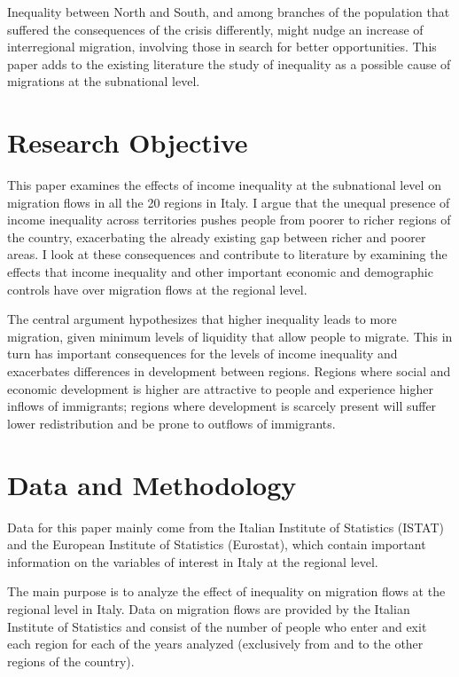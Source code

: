 \documentclass{article}
\theoremstyle{definition}
\theoremstyle{remark}
\begin{document}
Inequality between North and South, and among branches of the population that suffered the consequences of the crisis differently, might nudge an increase of interregional migration, involving those in search for better opportunities. This paper adds to the existing literature the study of inequality as a possible cause of migrations at the subnational level. 

\section{Research Objective}
This paper examines the effects of income inequality at the subnational level on migration flows in all the 20 regions in Italy. I argue that the unequal presence of income inequality across territories pushes people from poorer to richer regions of the country, exacerbating the already existing gap between richer and poorer areas. I look at these consequences and contribute to literature by examining the effects that income inequality and other important economic and demographic controls have over migration flows at the regional level.

The central argument hypothesizes that higher inequality leads to more migration, given minimum levels of liquidity that allow people to migrate. This in turn has important consequences for the levels of income inequality and exacerbates differences in development between regions. Regions where social and economic development is higher are attractive to people and experience higher inflows of immigrants; regions where development is scarcely present will suffer lower redistribution and be prone to outflows of immigrants. 

\section{Data and Methodology}
Data for this paper mainly come from the Italian Institute of Statistics (ISTAT) and the European Institute of Statistics (Eurostat), which contain important information on the variables of interest in Italy at the regional level.

The main purpose is to analyze the effect of inequality on migration flows at the regional level in Italy. Data on migration flows are provided by the Italian Institute of Statistics and consist of the number of people who enter and exit each region for each of the years analyzed (exclusively from and to the other regions of the country). 
\end{document}
